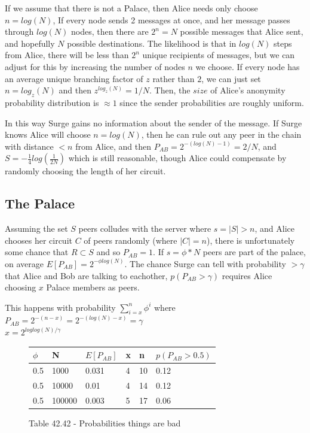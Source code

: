\documentclass[twocolumn]{paper}
\begin{document}
If we assume that there is not a Palace, then Alice needs only choose $n = log(N)$, If every node sends 2 messages at once, and her message passes through $log(N)$ nodes, then there are $2^n = N$ possible messages that Alice sent, and hopefully $N$ possible destinations. The likelihood is that in $log(N)$ steps from Alice, there will be less than $2^n$ unique recipients of messages, but we can adjust for this by increasing the number of nodes $n$ we choose. If every node has an average unique branching factor of $z$ rather than $2$, we can just set $n = log_z(N)$ and then $z^{log_z(N)} = 1/N$. Then, the $size$ of Alice's anonymity probability distribution is $\approx 1$ since the sender probabilities are roughly uniform.

In this way Surge gains no information about the sender of the message. If Surge knows Alice will choose $n = log(N)$, then he can rule out any peer in the chain with distance $< n$ from Alice, and then $P_{AB} = 2^{-(log(N)-1)} = 2/N$, and $S = - \frac{1}{4} log(\frac{1}{2N})$ which is still reasonable, though Alice could compensate by randomly choosing the length of her circuit. 

\subsection{The Palace} Assuming the set $S$ peers colludes with the server where $s = |S| > n$, and Alice chooses her circuit $C$ of peers randomly (where $|C| = n$), there is unfortunately some chance that $R \subset S$ and so $P_{AB} = 1$. If $s = \phi*N$ peers are part of the palace, on average $E[P_{AB}] = 2^{-\phi log(N)}$. The chance Surge can tell with probability $> \gamma$ that Alice and Bob are talking to eachother, $p(P_{AB} > \gamma)$ requires Alice choosing $x$ Palace members as peers. 

This happens with probability $\sum\limits_{i=x}^n\phi^i$ where 
\\ $P_{AB} = 2^{-(n - x)} = 2^{-(log(N) - x)} = \gamma$
\\ $x = 2^{loglog(N)/\gamma}$

\begin{figure}[ht]
    \begin{tabular}{| l | l | l | l | l | l |}
      \hline
      $\phi$ & N & $E[P_{AB}]$ & x & n & $p(P_{AB} > 0.5)$ \\\hline
      0.5 & 1000 & 0.031 & 4 & 10 & 0.12\\
      0.5 & 10000 & 0.01 & 4 & 14 & 0.12\\
      0.5 & 100000 & 0.003 & 5 & 17 & 0.06\\
      \hline
    \end{tabular}
    \caption{Table 42.42 - Probabilities things are bad}
\end{figure}
\end{document}
